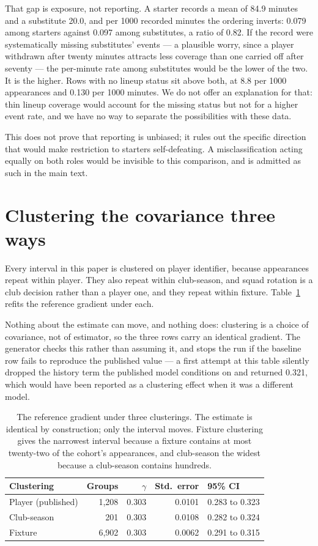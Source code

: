 \documentclass[11pt]{article}
\begin{document}
That gap is exposure, not reporting. A starter records a mean of 84.9 minutes and a substitute 20.0, and per 1000 recorded minutes the ordering inverts: 0.079 among starters against 0.097 among substitutes, a ratio of 0.82. If the record were systematically missing substitutes' events --- a plausible worry, since a player withdrawn after twenty minutes attracts less coverage than one carried off after seventy --- the per-minute rate among substitutes would be the lower of the two. It is the higher. Rows with no lineup status sit above both, at 8.8 per 1000 appearances and 0.130 per 1000 minutes. We do not offer an explanation for that: thin lineup coverage would account for the missing status but not for a higher event rate, and we have no way to separate the possibilities with these data.

This does not prove that reporting is unbiased; it rules out the specific direction that would make restriction to starters self-defeating. A misclassification acting equally on both roles would be invisible to this comparison, and is admitted as such in the main text.

\section{Clustering the covariance three ways}

Every interval in this paper is clustered on player identifier, because appearances repeat within player. They also repeat within club-season, and squad rotation is a club decision rather than a player one, and they repeat within fixture. Table~\ref{tab:supp_clustering} refits the reference gradient under each.

Nothing about the estimate can move, and nothing does: clustering is a choice of covariance, not of estimator, so the three rows carry an identical gradient. The generator checks this rather than assuming it, and stops the run if the baseline row fails to reproduce the published value --- a first attempt at this table silently dropped the history term the published model conditions on and returned 0.321, which would have been reported as a clustering effect when it was a different model.

\begin{table}[h]
\centering
\caption{The reference gradient under three clusterings. The estimate is identical by construction; only the interval moves. Fixture clustering gives the narrowest interval because a fixture contains at most twenty-two of the cohort's appearances, and club-season the widest because a club-season contains hundreds.}
\label{tab:supp_clustering}
\footnotesize
\setlength{\tabcolsep}{6pt}
\begin{tabular}{lrrrl}
\toprule
Clustering & Groups & $\gamma$ & Std.\ error & 95\% CI\\
\midrule
Player (published) & 1,208 & 0.303 & 0.0101 & 0.283 to 0.323\\
Club-season & 201 & 0.303 & 0.0108 & 0.282 to 0.324\\
Fixture & 6,902 & 0.303 & 0.0062 & 0.291 to 0.315\\
\bottomrule
\end{tabular}
\end{table}
\end{document}
